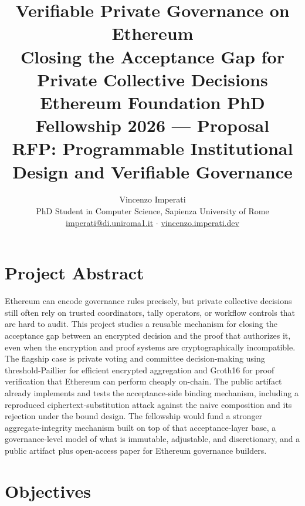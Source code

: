 \documentclass[11pt]{article}
\title{\vspace{-1.5cm}\textbf{Verifiable Private Governance on Ethereum}\\[6pt]
\large Closing the Acceptance Gap for Private Collective Decisions\\[10pt]
\normalsize Ethereum Foundation PhD Fellowship 2026 --- Proposal\\
\normalsize RFP: Programmable Institutional Design and Verifiable Governance}
\author{Vincenzo Imperati\\
\small PhD Student in Computer Science, Sapienza University of Rome\\
\small \href{mailto:imperati@di.uniroma1.it}{imperati@di.uniroma1.it}
\; $\cdot$ \;
\href{https://vincenzo.imperati.dev}{vincenzo.imperati.dev}}
\date{}
\begin{document}
\maketitle
\thispagestyle{fancy}

\section{Project Abstract}

Ethereum can encode governance rules precisely, but private collective
decisions still often rely on trusted coordinators, tally operators, or
workflow controls that are hard to audit. This project studies a reusable
mechanism for closing the acceptance gap between an encrypted decision and the
proof that authorizes it, even when the encryption and proof systems are
cryptographically incompatible. The flagship case is private voting and
committee decision-making using threshold-Paillier for efficient encrypted
aggregation and Groth16 for proof verification that Ethereum can perform
cheaply on-chain. The public artifact already implements and tests the
acceptance-side binding mechanism, including a reproduced ciphertext-substitution
attack against the naive composition and its rejection under the bound design.
The fellowship would fund a stronger aggregate-integrity mechanism built on top
of that acceptance-layer base, a governance-level model of what is immutable,
adjustable, and discretionary, and a public artifact plus open-access paper for
Ethereum governance builders.


\section{Objectives}
\end{document}
